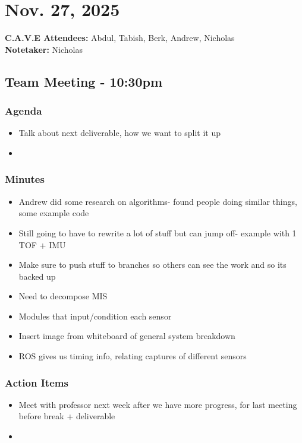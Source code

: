 	\pagebreak
	\section*{Nov. 27, 2025}

	\textbf{C.A.V.E Attendees:} Abdul, Tabish, Berk, Andrew, Nicholas\\
	\textbf{Notetaker:} Nicholas

	\subsection*{Team Meeting - 10:30pm}
		\subsubsection*{Agenda}
			\begin{itemize}
				\item Talk about next deliverable, how we want to split it up
				\item 
			\end{itemize}

		\subsubsection*{Minutes}
			\begin{itemize}
				\item Andrew did some research on algorithms- found people doing similar things, some example code
				\item Still going to have to rewrite a lot of stuff but can jump off- example with 1 TOF + IMU
				\item Make sure to push stuff to branches so others can see the work and so its backed up
				\item Need to decompose MIS
				\item Modules that input/condition each sensor 
				\item Insert image from whiteboard of general system breakdown
				\item ROS gives us timing info, relating captures of different sensors
			\end{itemize}

		\subsubsection*{Action Items}
			\begin{itemize}
				\item Meet with professor next week after we have more progress, for last meeting before break + deliverable
				\item 
			\end{itemize}


